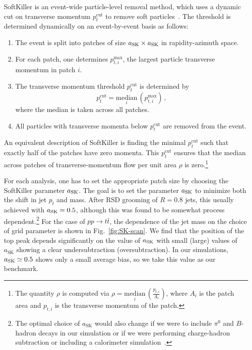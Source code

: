 \documentclass[11pt,a4paper]{article}
\DeclareRobustCommand{\Fig}[1]{Fig.~\ref{#1}}
\begin{document}
SoftKiller is an event-wide particle-level removal method, which uses
a dynamic cut on transverse momentum $p_t^{\text{cut}}$ to remove soft
particles~\cite{Cacciari:2014gra}.
%
The threshold is determined dynamically on an event-by-event basis as
follows:
%
\begin{enumerate}
%
\item The event is split into patches of size $a_{\rm SK} \times a_{\rm SK}$ in rapidity-azimuth space.
%
\item For each patch, one determines $p_{t,i}^{\text{max}}$, the largest particle transverse momentum in patch $i$.
%
\item The transverse momentum threshold $p_t^{\text{cut}}$ is determined by
\begin{equation}
  p_t^\text{cut} = \underset{i}{\text{median}}\, \left(p_{t,i}^{\text{max}}\right)\,,
\end{equation}
where the median is taken across all patches.
%
\item All particles with transverse momenta below $p_t^{\text{cut}}$ are removed from the event.
%
\end{enumerate} 
%
An equivalent description of SoftKiller is finding the minimal $p_t^{\text{cut}}$ such that
exactly half of the patches have zero momenta.
%
This $p_t^{\text{cut}}$ ensures that the median across patches of transverse-momentum flow
per unit area $\rho$ is zero.\footnote{The quantity $\rho$ is computed via $\rho = \underset{i}{\text{median}}\,\left( \frac{p_{t,i}}{A_i}\right)$,
where $A_i$ is the patch area and $p_{t,i}$ is the transverse momentum of the patch.}

For each analysis, one has to set the appropriate patch size by choosing the SoftKiller parameter $a_{\rm SK}$.
%
The goal is to set the parameter $a_{\rm SK}$ to minimize both the shift in jet $p_t$ and
mass.
%
After RSD grooming of $R=0.8$ jets, this usually achieved
with $a_{\rm SK}=0.5$, although this was found to be somewhat process
dependent.\footnote{The optimal choice of $a_{\text{SK}}$ would also
  change if we were to include $\pi^0$ and $B$-hadron decays in our
  simulation or if we were performing charge-hadron subtraction or
  including a calorimeter simulation~\cite{Cacciari:2014gra}.}
%
For the case of $pp\rightarrow t\bar{t}$, the dependence of the jet mass on the choice of grid parameter is
shown in \Fig{fig:SK-scan}.
%
We find that the position of
  the top peak depends significantly on the value of  $a_{\rm SK}$ with small (large) values of $a_{\text{SK}}$ showing a clear
  undersubtraction (oversubtraction).
  In our simulations, $a_{\rm SK}
  \simeq 0.5$ shows only a small average bias, so we take this value as our benchmark.
    
\end{document}
